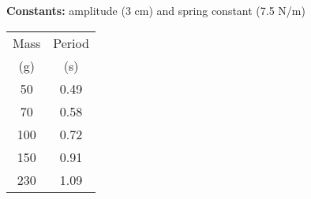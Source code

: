 \documentclass[10pt]{exam}
\begin{document}
{\bf Constants:} amplitude (3 cm) and spring constant (7.5 N/m)


\begin{center}
  
  \begin{tabular}{cc}
    \hline
     Mass & Period   \\
     (g)  & (s)  \\
     \hline
      50  & 0.49 \\
      70  & 0.58 \\
     100  & 0.72 \\
     150  & 0.91 \\
     230  & 1.09 \\
    \hline \hline 
  \end{tabular}
\end{center}
\end{document}
